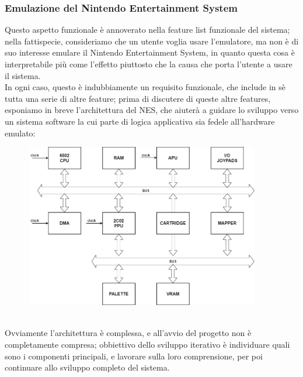 \documentclass[11pt]{article}
\begin{document}
\subsubsection{Emulazione del Nintendo Entertainment System}
Questo aspetto funzionale è annoverato nella feature list funzionale del sistema; nella fattispecie, consideriamo che un utente voglia usare l'emulatore, ma non è di suo interesse emulare il Nintendo Entertainment System, in quanto questa cosa è interpretabile più come l'effetto piuttosto che la causa che porta l'utente a usare il sistema.\\
In ogni caso, questo è indubbiamente un requisito funzionale, che include in sè tutta una serie di altre feature; prima di discutere di queste altre features, esponiamo in breve l'architettura del NES, che aiuterà a guidare lo sviluppo verso un sistema software la cui parte di logica applicativa sia fedele all'hardware emulato:
\begin{figure}[h]
\hspace*{-1cm}
\centering
\includegraphics[width=390px, height=270px]{NES_ARCH.png}
\end{figure}\\
Ovviamente l'architettura è complessa, e all'avvio del progetto non è completamente compresa; obbiettivo dello sviluppo iterativo è individuare quali sono i componenti principali, e lavorare sulla loro comprensione, per poi continuare allo sviluppo completo del sistema.\clearpage
\end{document}
